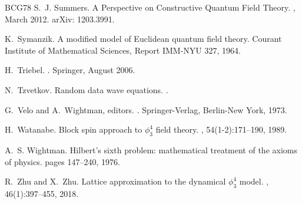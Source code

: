 \documentclass[a4paper,11pt]{article}
\numberwithin{equation}{section}
\begin{document}
\begin{thebibliography}{BCG{\etalchar{+}}78}
S.~J. Summers.
\newblock A {Perspective} on {Constructive} {Quantum} {Field} {Theory}.
, March 2012.
\newblock arXiv: 1203.3991.

K.~Symanzik.
\newblock A modified model of {E}uclidean quantum field theory.
\newblock Courant Institute of Mathematical Sciences, Report IMM-NYU 327, 1964.

H.~Triebel.
.
\newblock Springer, August 2006.

N.~Tzvetkov.
\newblock Random data wave equations.
.

G.~Velo and A.~Wightman, editors.
.
\newblock Springer-Verlag, Berlin-New York, 1973.

H.~Watanabe.
\newblock Block spin approach to $\phi^4_3$ field theory.
, 54(1-2):171--190, 1989.

A.~S. Wightman.
\newblock Hilbert's sixth problem: mathematical treatment of the axioms of
  physics.
\newblock pages 147--240, 1976.

R.~Zhu and X.~Zhu.
\newblock Lattice approximation to the dynamical $\phi^4_3$ model.
, 46(1):397--455, 2018.

\end{thebibliography}
\end{document}
